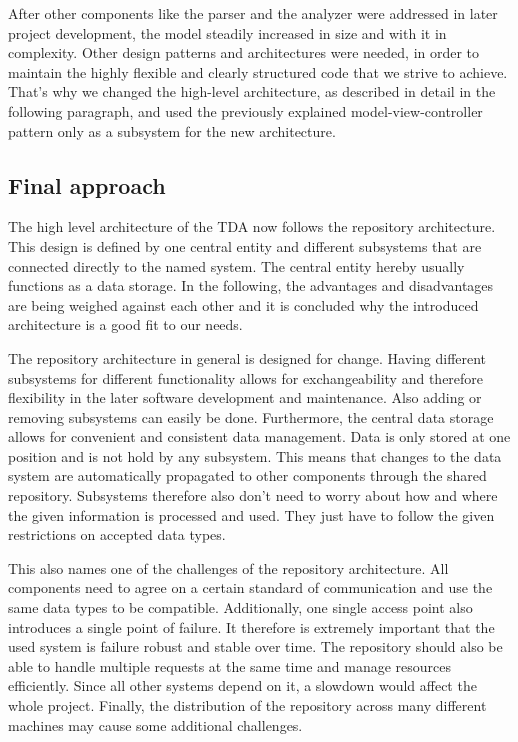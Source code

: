 After other components like the parser and the analyzer were addressed in later project development, the model steadily increased in size and with it in complexity. Other design patterns and architectures were needed, in order to maintain the highly flexible and clearly structured code that we strive to achieve. That's why we changed the high-level architecture, as described in detail in the following paragraph, and used the previously explained model-view-controller pattern only as a subsystem for the new architecture.

\subsection{Final approach}
The high level architecture of the TDA now follows the repository architecture. This design is defined by one central entity and different subsystems that are connected directly to the named system. The central entity hereby usually functions as a data storage. In the following, the advantages and disadvantages are being weighed against each other and it is concluded why the introduced architecture is a good fit to our needs.

The repository architecture in general is designed for change. Having different subsystems for different functionality allows for exchangeability and therefore flexibility in the later software development and maintenance. Also adding or removing subsystems can easily be done. Furthermore, the central data storage allows for convenient and consistent data management. Data is only stored at one position and is not hold by any subsystem. This means that changes to the data system are automatically propagated to other components through the shared repository. Subsystems therefore also don't need to worry about how and where the given information is processed and used. They just have to follow the given restrictions on accepted data types.

This also names one of the challenges of the repository architecture. All components need to agree on a certain standard of communication and use the same data types to be compatible. Additionally, one single access point also introduces a single point of failure. It therefore is extremely important that the used system is failure robust and stable over time. The repository should also be able to handle multiple requests at the same time and manage resources efficiently. Since all other systems depend on it, a slowdown would affect the whole project. Finally, the distribution of the repository across many different machines may cause some additional challenges.


